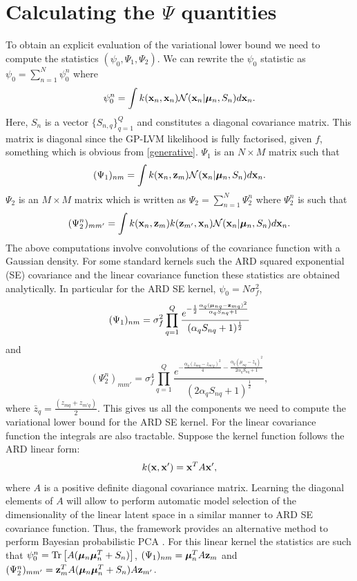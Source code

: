 \section{Calculating the $\Psi$ quantities}
To obtain an explicit evaluation of the variational lower bound we
need to compute the statistics $(\psi_0,\Psi_1,\Psi_2)$. We can
rewrite the $\psi_0$ statistic as $\psi_0 = \sum_{n=1}^N \psi_0^n$
where
\begin{equation}
\psi_0^n = \int k(\mathbf{x}_n,\mathbf{x}_n) \mathcal{N}(\mathbf{x}_n |\boldsymbol \mu_n , S_n) d \mathbf{x}_n.
\label{eq:psi0}
\end{equation}
Here, $S_n$ is a vector $\{ S_{n,q}\}_{q=1}^Q$ and constitutes a diagonal
covariance matrix. This matrix is diagonal since the GP-LVM likelihood is
fully factorised, given $f$, something which is obvious from \eqref{generative}.
%
$\Psi_1$ is an $N \times M$ matrix such that  
\begin{equation}
  (\Psi_1)_{nm} = \int k(\mathbf{x}_n,\mathbf{z}_m) \mathcal{N}(\mathbf{x}_n|\boldsymbol \mu_n, S_n) d
  \mathbf{x}_n.
\label{eq:psi1}
\end{equation}
$\Psi_2$ is an $M \times M$ matrix which is written as
 $\Psi_2 = \sum_{n=1}^N \Psi_2^n$ where $\Psi_2^n$ is such that 
\begin{equation}
  (\Psi^n_2)_{m m'} = \int k(\mathbf{x}_n,\mathbf{z}_m)
  k(\mathbf{z}_{m'},\mathbf{x}_n) \mathcal{N}(\mathbf{x}_n|\boldsymbol \mu_n, S_n) d \mathbf{x}_n.
\label{eq:psi2}
\end{equation}
The above computations involve convolutions of the covariance function
with a Gaussian density. For some standard kernels such the ARD
squared exponential (SE) covariance and the linear covariance function
these statistics are obtained analytically. In particular for the ARD
SE kernel, $\psi_0 = N \sigma_f^2$,
$$
(\Psi_1)_{nm} = \sigma^2_f \prod_{q=1}^Q
\frac{ e^{ - \frac{1}{2} \frac{ \alpha_q (\boldsymbol \mu_{nq}  -
    \mathbf{z}_{mq})^2}{\alpha_q S_{nq} + 1}}}
{( \alpha_q S_{nq} + 1)^{\frac{1}{2}}} 
$$ 
and 
$$
(\Psi^n_2)_{m m'} = \sigma_f^4 
\prod_{q=1}^Q \frac{ e^{-  \frac{\alpha_q (z_{mq} -
    z_{m'q})^2}{4} - \frac{\alpha_q \left(\mu_{nq} -
 \bar{z}_{q} \right)^2}{2 \alpha_q S_{nq} + 1}}}
{(2 \alpha_q S_{nq} + 1)^{\frac{1}{2}}},
$$  
where $\bar{z}_{q} = \frac{(z_{mq} + z_{m'q})}{2}$. This gives us all
the components we need to compute the variational lower bound for the
ARD SE kernel. For the linear covariance function the integrals
are also tractable. Suppose the kernel function follows the ARD linear
form:
\begin{equation} 
k(\mathbf{x},\mathbf{x}') = \mathbf{x}^T A \mathbf{x}', 
\end{equation}
where $A$ is a positive definite diagonal covariance matrix.  Learning
the diagonal elements of $A$ will allow to perform automatic model selection of
the dimensionality of the linear latent space in a similar manner to
ARD SE covariance function. Thus, the framework provides an alternative
method to perform Bayesian probabilistic PCA
\cite{Bishop:bayesPCA98,Minka:automatic01}. For this linear kernel
the statistics are such that $ \psi_0^n =
\text{Tr}\left[A (\boldsymbol \mu_n \boldsymbol \mu_n^T + S_n) \right]$,
$(\Psi_1)_{nm} = \boldsymbol \mu_n^T A \mathbf{z}_m$ and $(\Psi_2^n)_{mm'} =
\mathbf{z}_m^T A (\boldsymbol \mu_n\boldsymbol \mu_n^T + S_n ) A \mathbf{z}_{m'}$.

